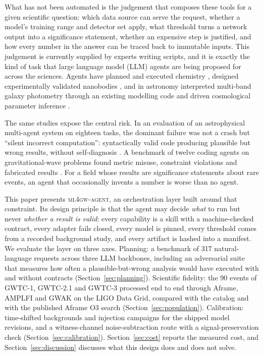 \documentclass[twocolumn]{aastex631}
\newcommand{\agent}{\textsc{ml4gw-agent}}
\begin{document}
What has not been automated is the judgement that composes these tools for
a given scientific question: which data source can serve the request,
whether a model's training range and detector set apply, what threshold
turns a network output into a significance statement, whether an
expensive step is justified, and how every number in the answer can be
traced back to immutable inputs. This judgement is currently supplied by
experts writing scripts, and it is exactly the kind of task that large
language model (LLM) agents are being proposed for across the sciences.
Agents have planned and executed chemistry \citep{boiko2023,bran2024},
designed experimentally validated nanobodies \citep{swanson2025}, and in
astronomy interpreted multi-band galaxy photometry through an existing
modelling code \citep{sun2026} and driven cosmological parameter
inference \citep{laverick2024}.

The same studies expose the central risk. In an evaluation of an
astrophysical multi-agent system on eighteen tasks, the dominant failure
was not a crash but ``silent incorrect computation'': syntactically valid
code producing plausible but wrong results, without self-diagnosis
\citep{rawat2026}. A benchmark of twelve coding agents on
gravitational-wave problems found metric misuse, constraint violations and
fabricated results \citep{islam2026}. For a field whose results are
significance statements about rare events, an agent that occasionally
invents a number is worse than no agent.

This paper presents \agent, an orchestration layer built around that
constraint. Its design principle is that the agent may decide \emph{what}
to run but never \emph{whether a result is valid}: every capability is a
skill with a machine-checked contract, every adapter fails closed, every
model is pinned, every threshold comes from a recorded background study,
and every artifact is hashed into a manifest. We evaluate the layer on
three axes. Planning: a benchmark of 317 natural-language requests across
three LLM backbones, including an adversarial suite that measures how
often a plausible-but-wrong analysis would have executed with and without
contracts (Section~\ref{sec:planning}). Scientific fidelity: the 90 events
of GWTC-1, GWTC-2.1 and GWTC-3 processed end to end through Aframe, AMPLFI
and GWAK on the LIGO Data Grid, compared with the catalog and with the
published Aframe O3 search (Section~\ref{sec:population}). Calibration:
time-shifted backgrounds and injection campaigns for the shipped model
revisions, and a witness-channel noise-subtraction route with a
signal-preservation check (Section~\ref{sec:calibration}). Section~\ref{sec:cost}
reports the measured cost, and Section~\ref{sec:discussion} discusses what
this design does and does not solve.
\end{document}
